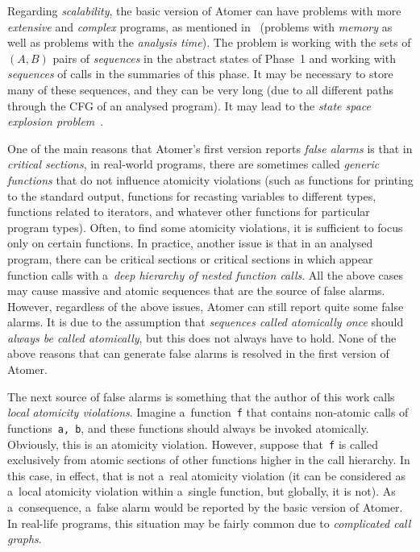 Regarding \emph{scalability}, the basic version of Atomer can have problems with more \emph{extensive} and \emph{complex} programs, as mentioned in~\cite{harmimBP} (problems with \emph{memory} as well as problems with the \emph{analysis time}). The problem is working with the sets of $ (A, B) $ pairs of \emph{sequences} in the abstract states of Phase~1 and working with \emph{sequences} of calls in the summaries of this phase. It may be necessary to store many of these sequences, and they can be very long (due to all different paths through the CFG of an analysed program). It may lead to the \emph{state space explosion problem}~\cite{stateExpl}.

One of the main reasons that Atomer's first version reports \emph{false alarms} is that in \emph{critical sections}, in real-world programs, there are sometimes called \emph{generic functions} that do not influence atomicity violations (such as functions for printing to the standard output, functions for recasting variables to different types, functions related to iterators, and whatever other  functions for particular program types). Often, to find some atomicity violations, it is sufficient to focus only on certain  functions. In practice, another issue is that in an analysed program, there can be  critical sections or critical sections in which appear function calls with a~\emph{deep hierarchy of nested function calls}. All the above cases may cause massive and  atomic sequences that are the source of false alarms. However, regardless of the above issues, Atomer can still report quite some false alarms. It is due to the assumption that \emph{sequences called atomically once} should \emph{always be called atomically}, but this does not always have to hold. None of the above reasons that can generate false alarms is resolved in the first version of Atomer.

The next source of false alarms is something that the author of this work calls \emph{local atomicity violations}. Imagine a~function~\texttt{f} that contains non-atomic calls of functions~\texttt{a, b}, and these functions should always be invoked atomically. Obviously, this is an atomicity violation. However, suppose that~\texttt{f} is called exclusively from atomic sections of other functions higher in the call hierarchy. In this case, in effect, that is not a~real atomicity violation (it can be considered as a~local atomicity violation within a~single function, but globally, it is not). As a~consequence, a~false alarm would be reported by the basic version of Atomer. In real-life programs, this situation may be fairly common due to \emph{complicated call graphs}.

